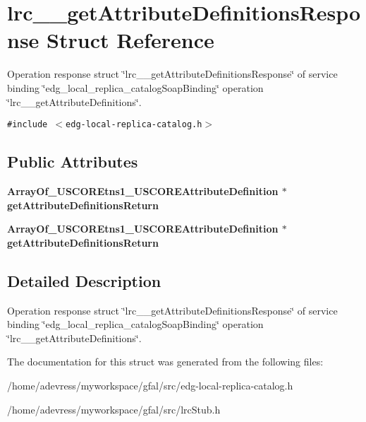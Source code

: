 \section{lrc\_\-\_\-get\-Attribute\-Definitions\-Response Struct Reference}
\label{structlrc____getAttributeDefinitionsResponse}
Operation response struct \char`\"{}lrc\_\-\_\-get\-Attribute\-Definitions\-Response\char`\"{} of service binding \char`\"{}edg\_\-local\_\-replica\_\-catalog\-Soap\-Binding\char`\"{} operation \char`\"{}lrc\_\-\_\-get\-Attribute\-Definitions\char`\"{}.  


{\tt \#include $<$edg-local-replica-catalog.h$>$}

\subsection*{Public Attributes}
\begin{CompactItemize}
\item 
\bf{Array\-Of\_\-USCOREtns1\_\-USCOREAttribute\-Definition} $\ast$ \textbf{get\-Attribute\-Definitions\-Return}\label{structlrc____getAttributeDefinitionsResponse_064a7a03101036dd1889b43036b2d124}

\item 
\bf{Array\-Of\_\-USCOREtns1\_\-USCOREAttribute\-Definition} $\ast$ \textbf{get\-Attribute\-Definitions\-Return}\label{structlrc____getAttributeDefinitionsResponse_064a7a03101036dd1889b43036b2d124}

\end{CompactItemize}


\subsection{Detailed Description}
Operation response struct \char`\"{}lrc\_\-\_\-get\-Attribute\-Definitions\-Response\char`\"{} of service binding \char`\"{}edg\_\-local\_\-replica\_\-catalog\-Soap\-Binding\char`\"{} operation \char`\"{}lrc\_\-\_\-get\-Attribute\-Definitions\char`\"{}. 



The documentation for this struct was generated from the following files:\begin{CompactItemize}
\item 
/home/adevress/myworkspace/gfal/src/edg-local-replica-catalog.h\item 
/home/adevress/myworkspace/gfal/src/lrc\-Stub.h\end{CompactItemize}
